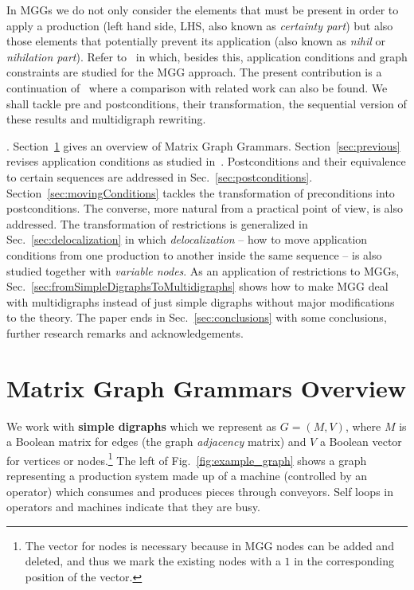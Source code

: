 \documentclass{fundam}
\begin{document}
In MGGs we do not only consider the elements that must be present in
order to apply a production (left hand side, LHS, also known as
\emph{certainty part}) but also those elements that potentially
prevent its application (also known as \emph{nihil} or
\emph{nihilation part}). Refer to~\cite{MGGfundamenta} in which,
besides this, application conditions and graph constraints are studied
for the MGG approach. The present contribution is a continuation
of~\cite{MGGfundamenta} where a comparison with related work can also be
found. We shall tackle pre and postconditions, their transformation,
the sequential version of these results and multidigraph rewriting.

. Section~\ref{sec:MGGs} gives an
overview of Matrix Graph Grammars. Section~\ref{sec:previous} revises
application conditions as studied
in~\cite{MGGfundamenta}. Postconditions and their equivalence to
certain sequences are addressed in
Sec.~\ref{sec:postconditions}. Section~\ref{sec:movingConditions}
tackles the transformation of preconditions into postconditions. The
converse, more natural from a practical point of view, is also
addressed. The transformation of restrictions is generalized in
Sec.~\ref{sec:delocalization} in which \emph{delocalization} -- how to
move application conditions from one production to another inside the
same sequence -- is also studied together with \emph{variable
  nodes}. As an application of restrictions to MGGs,
Sec.~\ref{sec:fromSimpleDigraphsToMultidigraphs} shows how to make MGG
deal with multidigraphs instead of just simple digraphs without major
modifications to the theory. The paper ends in
Sec.~\ref{sec:conclusions} with some conclusions, further research
remarks and acknowledgements.

\section{Matrix Graph Grammars Overview}
\label{sec:MGGs}


We work with \textbf{simple digraphs} which we represent as $G =
(M, V)$, where $M$ is a Boolean matrix for edges (the graph {\em
  adjacency} matrix) and $V$ a Boolean vector for vertices or
nodes.\footnote{The vector for nodes is necessary because in MGG nodes
  can be added and deleted, and thus we mark the existing nodes with a
  $1$ in the corresponding position of the vector.} The left of
Fig.~\ref{fig:example_graph} shows a graph representing a production
system made up of a machine (controlled by an operator) which consumes
and produces pieces through conveyors. Self loops in operators and
machines indicate that they are busy.
\end{document}

